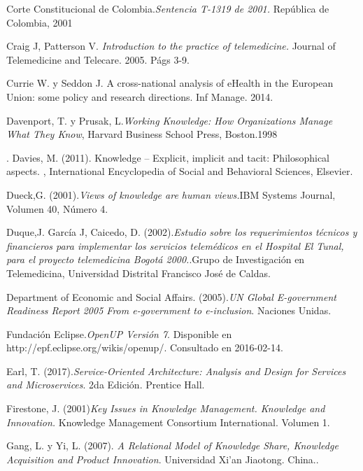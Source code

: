 \begin{thebibliography}{}
 Corte Constitucional de Colombia.\textit{Sentencia T-1319 de 2001.} República de Colombia, 2001

 Craig J, Patterson V. \textit{Introduction to the practice of telemedicine.} Journal of Telemedicine and Telecare. 2005. Págs 3-9.

 Currie W. y Seddon J. A cross-national analysis of eHealth in the European Union: some policy and research directions. Inf Manage. 2014.

 Davenport, T. y Prusak, L.\textit{Working Knowledge: How Organizations Manage What They Know}, Harvard Business School Press, Boston.1998

. Davies, M. (2011). Knowledge – Explicit, implicit and tacit: Philosophical aspects. , International Encyclopedia of Social and Behavioral Sciences, Elsevier.

 Dueck,G. (2001).\textit{Views of knowledge are human views.}IBM Systems Journal, Volumen 40, Número 4.

 Duque,J. García J, Caicedo, D. (2002).\textit{Estudio sobre los requerimientos técnicos y financieros para implementar los servicios telemédicos en el Hospital El Tunal,  para el proyecto telemedicina Bogotá 2000.}.Grupo de Investigación en Telemedicina,  Universidad Distrital Francisco José de Caldas.

 Department of Economic and Social Affairs. (2005).\textit{UN Global E-government Readiness Report 2005 From e-government to e-inclusion}. Naciones Unidas.

 Fundación Eclipse.\textit{OpenUP Versión 7}. Disponible en http://epf.eclipse.org/wikis/openup/. Consultado en 2016-02-14.


 Earl, T. (2017).\textit{Service-Oriented Architecture: Analysis and Design for Services and Microservices}. 2da Edición. Prentice Hall.

 Firestone, J. (2001)\textit{Key Issues in Knowledge Management. Knowledge and Innovation.} Knowledge Management Consortium International. Volumen 1. 

 Gang, L. y Yi, L. (2007). \textit{A Relational Model of Knowledge Share, Knowledge Acquisition and Product Innovation}. Universidad Xi'an Jiaotong. China..


\end{thebibliography}
